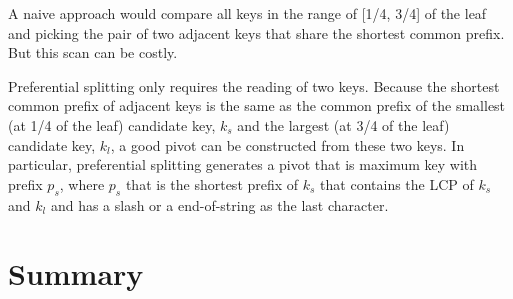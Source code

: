 A naive approach would compare all keys in the range of [1/4, 3/4] of the leaf
and picking the pair of two adjacent keys that share the shortest common prefix.
But this scan can be costly.

Preferential splitting only requires the reading of two keys.
Because the shortest common prefix of adjacent keys is the same as the common
prefix of the smallest (at 1/4 of the leaf) candidate key, $k_{s}$ and
the largest (at 3/4 of the leaf) candidate key, $k_{l}$,
a good pivot can be constructed from these two keys.
In particular, preferential splitting generates a pivot that is maximum key with
prefix $p_{s}$, where $p_{s}$ that is the shortest prefix of $k_{s}$ that
contains the LCP of $k_{s}$ and $k_{l}$ and has a slash or a end-of-string as
the last character.

\section{Summary}
